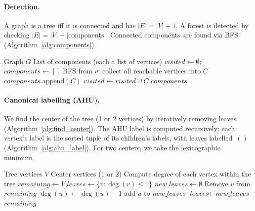 \documentclass[twoside]{article}
\begin{document}
\paragraph{Detection.} A graph is a tree iff it is connected and has $|E| = |V| - 1$. A forest is detected by checking $|E| = |V| - |\text{components}|$. Connected components are found via BFS (Algorithm~\ref{alg:components}).

\begin{algorithm}[H]
\caption{Find Connected Components (BFS)}\label{alg:components}
\begin{algorithmic}[1]
\Require Graph $G$
\Ensure List of components (each a list of vertices)
\State $\textit{visited} \gets \emptyset$;\quad $\textit{components} \gets []$
        \State BFS from $v$: collect all reachable vertices into $C$
        \State $\textit{components}.\text{append}(C)$
        \State $\textit{visited} \gets \textit{visited} \cup C$
    \EndIf
\EndFor
\State \Return $\textit{components}$
\end{algorithmic}
\end{algorithm}

\paragraph{Canonical labelling (AHU).} We find the center of the tree (1 or 2 vertices) by iteratively removing leaves (Algorithm~\ref{alg:find_center}). The AHU label is computed recursively: each vertex's label is the sorted tuple of its children's labels, with leaves labelled~$()$ (Algorithm~\ref{alg:ahu_label}). For two centers, we take the lexicographic minimum.

\begin{algorithm}[H]
\caption{Find Tree Center}\label{alg:find_center}
\begin{algorithmic}[1]
\Require Tree vertices $V$
\Ensure Center vertices (1 or 2)
\State Compute degree of each vertex within the tree
\State $\textit{remaining} \gets V$;\quad $\textit{leaves} \gets \{v : \deg(v) \leq 1\}$
    \State $\textit{new\_leaves} \gets \emptyset$
        \State Remove $v$ from $\textit{remaining}$
            \State $\deg(u) \gets \deg(u) - 1$
             add $u$ to $\textit{new\_leaves}$ \EndIf
        \EndFor
    \EndFor
    \State $\textit{leaves} \gets \textit{new\_leaves}$
\EndWhile
\State \Return $\textit{remaining}$
\end{algorithmic}
\end{algorithm}
\end{document}

